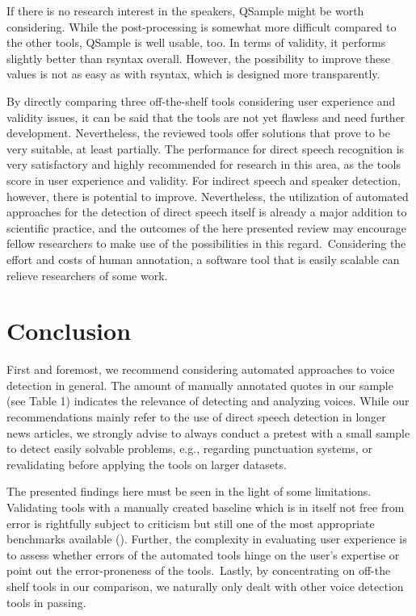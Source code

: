 \documentclass{ccr}
\begin{document}
If there is no research interest in the speakers, QSample might be worth
considering. While the post-processing is somewhat more difficult
compared to the other tools, QSample is well usable, too. In terms of
validity, it performs slightly better than rsyntax overall. However, the
possibility to improve these values is not as easy as with rsyntax,
which is designed more transparently.

By directly comparing three off-the-shelf tools considering user
experience and validity issues, it can be said that the tools are not
yet flawless and need further development. Nevertheless, the reviewed
tools offer solutions that prove to be very suitable, at least
partially. The performance for direct speech recognition is very
satisfactory and highly recommended for research in this area, as the
tools score in user experience and validity. For indirect speech and
speaker detection, however, there is potential to improve. Nevertheless,
the utilization of automated approaches for the detection of direct
speech itself is already a major addition to scientific practice, and
the outcomes of the here presented review may encourage fellow
researchers to make use of the possibilities in this regard.~Considering
the effort and costs of human annotation, a software tool that is easily
scalable can relieve researchers of some work.

\section{Conclusion}

First and foremost, we recommend considering automated approaches to
voice detection in general. The amount of manually annotated quotes in
our sample (see Table 1) indicates the relevance of detecting and
analyzing voices. While our recommendations mainly refer to the use of
direct speech detection in longer news articles, we strongly advise to
always conduct a pretest with a small sample to detect easily solvable
problems, e.g., regarding punctuation systems, or revalidating before applying the
tools on larger datasets.

The presented findings here must be seen in the light of some
limitations. Validating tools with a manually created baseline which is
in itself not free from error is rightfully subject to criticism but
still one of the most appropriate benchmarks available (\cite{song2020validations}). Further, the complexity in evaluating user experience is to
assess whether errors of the automated tools hinge on the user's
expertise or point out the error-proneness of the tools.~Lastly, by
concentrating on off-the shelf tools in our comparison, we naturally
only dealt with other voice detection tools in passing.
\end{document}
